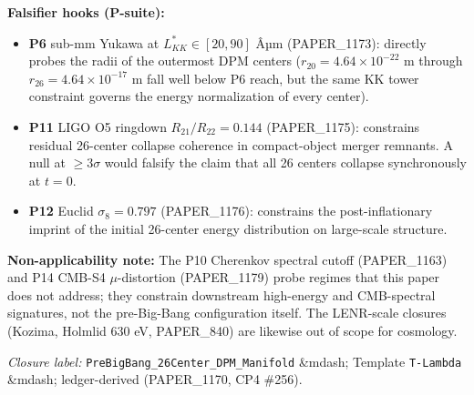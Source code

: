 \documentclass[12pt,a4paper]{article}
\begin{document}
\textbf{Falsifier hooks (P-suite):}

\begin{itemize}
  \item \textbf{P6} sub-mm Yukawa at $L_{KK}^{*}\in[20,90]$ Âµm (PAPER\_1173): directly probes the radii of the outermost DPM centers ($r_{20}=4.64\times10^{-22}$ m through $r_{26}=4.64\times10^{-17}$ m fall well below P6 reach, but the same KK tower constraint governs the energy normalization of every center).
  \item \textbf{P11} LIGO O5 ringdown $R_{21}/R_{22}=0.144$ (PAPER\_1175): constrains residual 26-center collapse coherence in compact-object merger remnants. A null at $\geq3\sigma$ would falsify the claim that all 26 centers collapse synchronously at $t=0$.
  \item \textbf{P12} Euclid $\sigma_8=0.797$ (PAPER\_1176): constrains the post-inflationary imprint of the initial 26-center energy distribution on large-scale structure.
\end{itemize}

\textbf{Non-applicability note:} The P10 Cherenkov spectral cutoff (PAPER\_1163) and P14 CMB-S4 $\mu$-distortion (PAPER\_1179) probe regimes that this paper does not address; they constrain downstream high-energy and CMB-spectral signatures, not the pre-Big-Bang configuration itself. The LENR-scale closures (Kozima, Holmlid 630 eV, PAPER\_840) are likewise out of scope for cosmology.

\emph{Closure label:} \texttt{PreBigBang\_26Center\_DPM\_Manifold} \&mdash; Template \texttt{T-Lambda} \&mdash; ledger-derived (PAPER\_1170, CP4 \#256).
\end{document}
